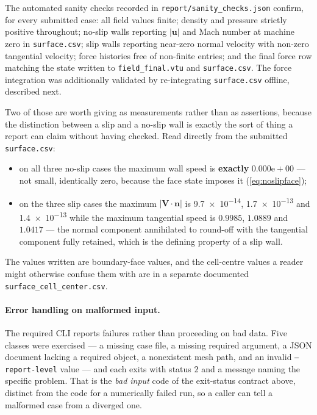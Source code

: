 The automated sanity checks recorded in \texttt{report/sanity\_checks.json}
confirm, for every submitted case: all field values finite; density and pressure
strictly positive throughout; no-slip walls reporting $|\mathbf{u}|$ and Mach
number at machine zero in \texttt{surface.csv}; slip walls reporting near-zero
normal velocity with non-zero tangential velocity; force histories free of
non-finite entries; and the final force row matching the state written to
\texttt{field\_final.vtu} and \texttt{surface.csv}. The force integration was
additionally validated by re-integrating \texttt{surface.csv} offline, described
next.

Two of those are worth giving as measurements rather than as assertions, because the
distinction between a slip and a no-slip wall is exactly the sort of thing a report can
claim without having checked. Read directly from the submitted \texttt{surface.csv}:
\begin{itemize}
  \item on all three no-slip cases the maximum wall speed is \textbf{exactly}
  $0.000\mathrm{e}{+}00$ --- not small, identically zero, because the face state imposes it
  (\cref{eq:noslipface});
  \item on the three slip cases the maximum $|\mathbf{V}\!\cdot\!\mathbf{n}|$ is
  \num{9.7e-14}, \num{1.7e-13} and \num{1.4e-13} while the maximum tangential speed is
  $0.9985$, $1.0889$ and $1.0417$ --- the normal component annihilated to round-off with the
  tangential component fully retained, which is the defining property of a slip wall.
\end{itemize}
The values written are boundary-face values, and the cell-centre values a reader might
otherwise confuse them with are in a separate documented \texttt{surface\_cell\_center.csv}.

\paragraph{Error handling on malformed input.} The required CLI reports failures rather than
proceeding on bad data. Five classes were exercised --- a missing case file, a missing
required argument, a JSON document lacking a required object, a nonexistent mesh path, and an
invalid \texttt{--report-level} value --- and each exits with status $2$ and a message naming
the specific problem. That is the \emph{bad input} code of the exit-status contract above,
distinct from the code for a numerically failed run, so a caller can tell a malformed case
from a diverged one.

